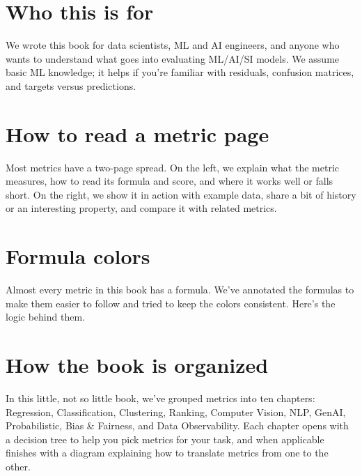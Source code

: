 
\begin{bookreadingguide}
\section{Who this is for}

We wrote this book for data scientists, ML and AI engineers, and anyone who wants to understand what goes into evaluating ML/AI/SI models. We assume basic ML knowledge; it helps if you're familiar with residuals, confusion matrices, and targets versus predictions.

\section{How to read a metric page}

Most metrics have a two-page spread. On the left, we explain what the metric measures, how to read its formula and score, and where it works well or falls short. On the right, we show it in action with example data, share a bit of history or an interesting property, and compare it with related metrics.

\section{Formula colors}

Almost every metric in this book has a formula. We've annotated the formulas to make them easier to follow and tried to keep the colors consistent. Here's the logic behind them.

\vspace{4pt}

\section{How the book is organized}

In this little, not so little book, we've grouped metrics into ten chapters: Regression, Classification, Clustering, Ranking, Computer Vision, NLP, GenAI, Probabilistic, Bias \& Fairness, and Data Observability. Each chapter opens with a decision tree to help you pick metrics for your task, and when applicable finishes with a diagram explaining how to translate metrics from one to the other.
\end{bookreadingguide}

